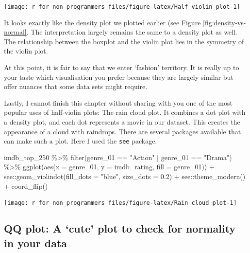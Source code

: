 \documentclass[
]{book}
\newenvironment{Shaded}{\begin{snugshade}}{\end{snugshade}}
\newcommand{\AttributeTok}[1]{\textcolor[rgb]{0.77,0.63,0.00}{#1}}
\newcommand{\FloatTok}[1]{\textcolor[rgb]{0.00,0.00,0.81}{#1}}
\newcommand{\FunctionTok}[1]{\textcolor[rgb]{0.00,0.00,0.00}{#1}}
\newcommand{\NormalTok}[1]{#1}
\newcommand{\SpecialCharTok}[1]{\textcolor[rgb]{0.00,0.00,0.00}{#1}}
\newcommand{\StringTok}[1]{\textcolor[rgb]{0.31,0.60,0.02}{#1}}
\begin{document}
\begin{center}\texttt{[image: r\_for\_non\_programmers\_files/figure-latex/Half violin plot-1]} \end{center}

It looks exactly like the density plot we plotted earlier (see Figure \ref{fig:density-vs-normal}. The interpretation largely remains the same to a density plot as well. The relationship between the boxplot and the violin plot lies in the symmetry of the violin plot.

At this point, it is fair to say that we enter `fashion' territory. It is really up to your taste which visualisation you prefer because they are largely similar but offer nuances that some data sets might require.

Lastly, I cannot finish this chapter without sharing with you one of the most popular uses of half-violin plots: The rain cloud plot. It combines a dot plot with a density plot, and each dot represents a movie in our dataset. This creates the appearance of a cloud with raindrops. There are several packages available that can make such a plot. Here I used the \texttt{see} package.

\begin{Shaded}
\begin{Highlighting}[]
\NormalTok{imdb\_top\_250 }\SpecialCharTok{\%\textgreater{}\%}
  \FunctionTok{filter}\NormalTok{(genre\_01 }\SpecialCharTok{==} \StringTok{"Action"} \SpecialCharTok{|}\NormalTok{ genre\_01 }\SpecialCharTok{==} \StringTok{"Drama"}\NormalTok{) }\SpecialCharTok{\%\textgreater{}\%} 
  \FunctionTok{ggplot}\NormalTok{(}\FunctionTok{aes}\NormalTok{(}\AttributeTok{x =}\NormalTok{ genre\_01, }\AttributeTok{y =}\NormalTok{ imdb\_rating, }\AttributeTok{fill =}\NormalTok{ genre\_01)) }\SpecialCharTok{+} 
\NormalTok{  see}\SpecialCharTok{::}\FunctionTok{geom\_violindot}\NormalTok{(}\AttributeTok{fill\_dots =} \StringTok{"blue"}\NormalTok{, }\AttributeTok{size\_dots =} \FloatTok{0.2}\NormalTok{) }\SpecialCharTok{+}
\NormalTok{  see}\SpecialCharTok{::}\FunctionTok{theme\_modern}\NormalTok{() }\SpecialCharTok{+}
  \FunctionTok{coord\_flip}\NormalTok{()}
\end{Highlighting}
\end{Shaded}

\begin{center}\texttt{[image: r\_for\_non\_programmers\_files/figure-latex/Rain cloud plot-1]} \end{center}

\hypertarget{qq-plot}{%
\subsection{QQ plot: A `cute' plot to check for normality in your data}\label{qq-plot}}
\end{document}
